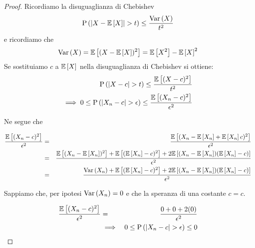 \begin{defn}
    \begin{proof}
        Ricordiamo la disuguaglianza di Chebishev
        \begin{equation*}
            \begin{aligned}
                \text{P}\left(\lvert X - \mathbb{E}\left[X\right]\rvert > t\right) \leq \frac{\text{Var}\left(X\right)}{t^2}
            \end{aligned}
        \end{equation*}
        e ricordiamo che
        \begin{equation*}
            \begin{aligned}
                \text{Var}\left(X\right) = \mathbb{E}\left[(X - \mathbb{E}\left[X\right])^2\right] = \mathbb{E}\left[X^2\right] - \mathbb{E}\left[X\right]^2
            \end{aligned}
        \end{equation*}
        Se sostituiamo $c$ a $\mathbb{E}\left[X\right]$ nella disuguaglianza di Chebishev si
        ottiene:
        \begin{equation*}
            \begin{aligned}
                \text{P}\left(\lvert X - c\rvert > t\right) \leq \frac{\mathbb{E}\left[(X - c)^2\right]}{t^2} \\
                \implies 0 \leq \text{P}\left(\lvert X_n - c\rvert > \epsilon\right) \leq \frac{\mathbb{E}\left[(X_n - c)^2\right]}{\epsilon^2} \\
            \end{aligned}
        \end{equation*}

        Ne segue che

        \begin{eqnarray*}
            \frac{\mathbb{E}\left[(X_n - c)^2\right]}{\epsilon^2} &=& \frac{\mathbb{E}\left[(X_n - \mathbb{E}\left[X_n\right] + \mathbb{E}\left[X_n\right] c)^2\right]}{\epsilon^2} \\
                &=& \dfrac{\mathbb{E}\left[(X_n - \mathbb{E}\left[X_n\right])^2\right] + \mathbb{E}\left[(\mathbb{E}\left[X_n\right] -c)^2\right] + 2 \mathbb{E}\left[(X_n - \mathbb{E}\left[X_n\right])(\mathbb{E}\left[X_n\right] - c)\right]}{\epsilon^2} \\
                &=& \frac{\text{Var}\left(X_n\right) + \mathbb{E}\left[(\mathbb{E}\left[X_n\right] -c)^2\right] + 2 \mathbb{E}\left[(X_n - \mathbb{E}\left[X_n\right])(\mathbb{E}\left[X_n\right] - c)\right]}{\epsilon^2}
        \end{eqnarray*}

        Sappiamo che, per ipotesi $\text{Var}\left(X_n\right) = 0$ e che la speranza di una
        costante $ c = c $.


        \begin{eqnarray*}
            \frac{\mathbb{E}\left[(X_n - c)^2\right]}{\epsilon^2} &=& \dfrac{0 + 0 + 2(0)}{\epsilon^2} \\
            &\implies& 0 \leq \text{P}\left(\lvert X_n - c\rvert > \epsilon\right) \leq 0
        \end{eqnarray*}

    \end{proof}

\end{defn}

